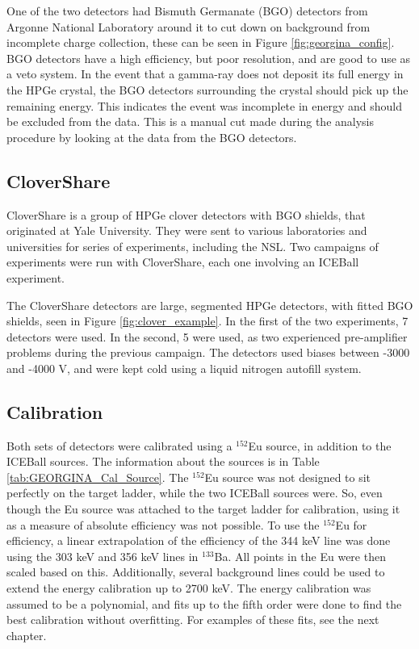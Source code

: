 

One of the two detectors had Bismuth Germanate (BGO) detectors from Argonne National Laboratory around it to cut down on background from incomplete charge collection, these can be seen in Figure \ref{fig:georgina_config}. BGO detectors have a high efficiency, but poor resolution, and are good to use as a veto system. In the event that a gamma-ray does not deposit its full energy in the HPGe crystal, the BGO detectors surrounding the crystal should pick up the remaining energy. This indicates the event was incomplete in energy and should be excluded from the data. This is a manual cut made during the analysis procedure by looking at the data from the BGO detectors.

\subsection{CloverShare}

CloverShare is a group of HPGe clover detectors with BGO shields, that originated at Yale University. They were sent to various laboratories and universities for series of experiments, including the NSL. Two campaigns of experiments were run with CloverShare, each one involving an ICEBall experiment.

The CloverShare detectors are large, segmented HPGe detectors, with fitted BGO shields, seen in Figure \ref{fig:clover_example}. In the first of the two experiments, 7 detectors were used. In the second, 5 were used, as two experienced pre-amplifier problems during the previous campaign. The detectors used biases between -3000 and -4000 V, and were kept cold using a liquid nitrogen autofill system.



\subsection{Calibration}
\label{sec:clover_cal}

Both sets of detectors were calibrated using a $^{152}$Eu source, in addition to the ICEBall sources. The information about the sources is in Table \ref{tab:GEORGINA_Cal_Source}. The $^{152}$Eu source was not designed to sit perfectly on the target ladder, while the two ICEBall sources were. So, even though the Eu source was attached to the target ladder for calibration, using it as a measure of absolute efficiency was not possible. To use the $^{152}$Eu for efficiency, a linear extrapolation of the efficiency of the 344 keV line was done using the 303 keV and 356 keV lines in $^{133}$Ba. All points in the Eu were then scaled based on this. Additionally, several background lines could be used to extend the energy calibration up to 2700 keV. The energy calibration was assumed to be a polynomial, and fits up to the fifth order were done to find the best calibration without overfitting. For examples of these fits, see the next chapter.

